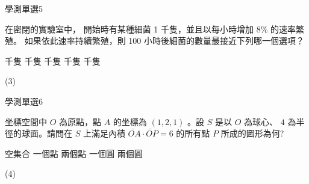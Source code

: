     \begin{QUESTION}
        \begin{ExamInfo}{99}{學測}{單選}{5}
        \end{ExamInfo}
        \begin{ExamAnsRateInfo}{26}{46}{20}{12}
        \end{ExamAnsRateInfo}
        \begin{QBODY}
            在密閉的實驗室中， 開始時有某種細菌 1 千隻，並且以每小時增加 $8\%$ 的速率繁殖。 如果依此速率持續繁殖，則 100 小時後細菌的數量最接近下列哪一個選項？
			\begin{QOPS} 
				 千隻 
				 千隻 
				 千隻
				 千隻 
				 千隻
			\end{QOPS}
        \end{QBODY}
        \begin{QFROMS}
        \end{QFROMS}
        \begin{QTAGS}\end{QTAGS}
        \begin{QANS}
            (3)
        \end{QANS}
        \begin{QSOLLIST}
        \end{QSOLLIST}
        \begin{QEMPTYSPACE}
        \end{QEMPTYSPACE}
    \end{QUESTION}
    \begin{QUESTION}
        \begin{ExamInfo}{99}{學測}{單選}{6}
        \end{ExamInfo}
        \begin{ExamAnsRateInfo}{49}{70}{53}{24}
        \end{ExamAnsRateInfo}
        \begin{QBODY}
            坐標空間中 $O$ 為原點，點 $A$ 的坐標為  $(1,2,1)$ 。設 $S$ 是以  $O$ 為球心、 $4$ 為半徑的球面。請問在 $S$ 上滿足內積 $\lvec{OA} \cdot \lvec{ OP} = 6$ 的所有點 $P$ 所成的圖形為何?
			\begin{QOPS} 
				\QOP 空集合 
				\QOP 一個點 
				\QOP 兩個點 
				\QOP 一個圓 
				\QOP 兩個圓 
			\end{QOPS}
        \end{QBODY}
        \begin{QFROMS}
        \end{QFROMS}
        \begin{QTAGS}\end{QTAGS}
        \begin{QANS}
            (4)
        \end{QANS}
        \begin{QSOLLIST}
        \end{QSOLLIST}
        \begin{QEMPTYSPACE}
        \end{QEMPTYSPACE}
    \end{QUESTION}
